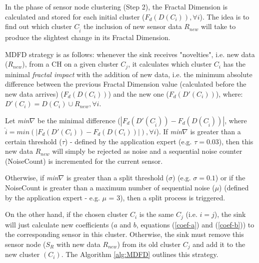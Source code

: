 \documentclass{acm_proc_article-sp}
\begin{document}
In the phase of sensor node clustering (Step 2), the Fractal Dimension is 
calculated and stored for each initial cluster
($F_{d}(D(C_i)), \forall i$). The idea is to find out which cluster
$C_{\hat{i}}$ the inclusion of new sensor data $R_{new}$ will take to produce
the slightest change in its Fractal Dimension.
\vspace*{-.3cm}

MDFD strategy is as follows:
whenever the sink receives "novelties", i.e. new data ($R_{new}$), from a CH on
a given cluster $C_j$, it calculates which cluster $C_i$ has the minimal
\textit{fractal impact} with the addition of new data, i.e. the minimum absolute
difference between the previous Fractal Dimension value (calculated before the
new data arrives) ($F_d(D(C_i))$) and the new one ($F_d(D'(C_i))$), where:
$D'(C_i) = D(C_i) \cup R_{new}, \forall i$.
\vspace*{-.3cm}

Let {\it min}$\nabla$ be the minimal difference ($|F_d(D'(C_{\hat{i}})) -
F_d(D(C_{\hat{i}}))|$, where $\hat{i} = min(|F_d(D'(C_i)) - F_d(D(C_i))|),
\forall i$). If {\it min}$\nabla$ is greater than a certain threshold ($\tau$) -
defined by the application expert (e.g. $\tau = 0.03$), then this new data
$R_{new}$ will simply be rejected as noise and a sequential noise counter
(NoiseCount) is incremented for the current sensor.
\vspace*{-.3cm}

Otherwise, if {\it min}$\nabla$ is greater than a split threshold ($\sigma$)
(e.g. $\sigma = 0.1$) or if the NoiseCount is greater than a maximum number of
sequential noise ($\mu$) (defined by the application expert - e.g. $\mu$ = 3),
then a split process is triggered.
\vspace*{-.3cm}

On the other hand, if the chosen cluster $C_i$ is the same $C_j$ (i.e.
$i=j$), the sink will just calculate new coefficients ($a$ and $b$, equations
(\ref{coef-a}) and (\ref{coef-b})) to the corresponding sensor in this cluster.
Otherwise, the sink must remove this sensor node ($S_{R}$ with new data
$R_{new}$) from its old cluster $C_j$ and add it to the new cluster $(C_i)$.
The Algorithm \ref{alg:MDFD} outlines this strategy.
\vspace*{-.3cm}
\end{document}
